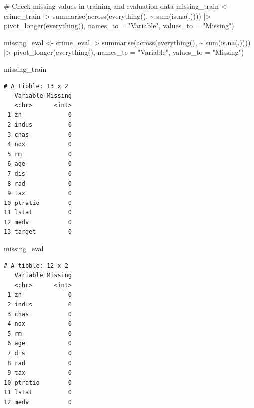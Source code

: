 \documentclass[
  11pt]{article}
\newenvironment{Shaded}{\begin{snugshade}}{\end{snugshade}}
\newcommand{\AttributeTok}[1]{\textcolor[rgb]{0.40,0.45,0.13}{#1}}
\newcommand{\CommentTok}[1]{\textcolor[rgb]{0.37,0.37,0.37}{#1}}
\newcommand{\FunctionTok}[1]{\textcolor[rgb]{0.28,0.35,0.67}{#1}}
\newcommand{\NormalTok}[1]{\textcolor[rgb]{0.00,0.23,0.31}{#1}}
\newcommand{\OtherTok}[1]{\textcolor[rgb]{0.00,0.23,0.31}{#1}}
\newcommand{\SpecialCharTok}[1]{\textcolor[rgb]{0.37,0.37,0.37}{#1}}
\newcommand{\StringTok}[1]{\textcolor[rgb]{0.13,0.47,0.30}{#1}}
\begin{document}
\begin{Shaded}
\begin{Highlighting}[]
\CommentTok{\# Check missing values in training and evaluation data}
\NormalTok{missing\_train }\OtherTok{\textless{}{-}}\NormalTok{ crime\_train }\SpecialCharTok{|\textgreater{}}
  \FunctionTok{summarise}\NormalTok{(}\FunctionTok{across}\NormalTok{(}\FunctionTok{everything}\NormalTok{(), }\SpecialCharTok{\textasciitilde{}} \FunctionTok{sum}\NormalTok{(}\FunctionTok{is.na}\NormalTok{(.)))) }\SpecialCharTok{|\textgreater{}}
  \FunctionTok{pivot\_longer}\NormalTok{(}\FunctionTok{everything}\NormalTok{(), }\AttributeTok{names\_to =} \StringTok{"Variable"}\NormalTok{, }\AttributeTok{values\_to =} \StringTok{"Missing"}\NormalTok{)}

\NormalTok{missing\_eval }\OtherTok{\textless{}{-}}\NormalTok{ crime\_eval }\SpecialCharTok{|\textgreater{}}
  \FunctionTok{summarise}\NormalTok{(}\FunctionTok{across}\NormalTok{(}\FunctionTok{everything}\NormalTok{(), }\SpecialCharTok{\textasciitilde{}} \FunctionTok{sum}\NormalTok{(}\FunctionTok{is.na}\NormalTok{(.)))) }\SpecialCharTok{|\textgreater{}}
  \FunctionTok{pivot\_longer}\NormalTok{(}\FunctionTok{everything}\NormalTok{(), }\AttributeTok{names\_to =} \StringTok{"Variable"}\NormalTok{, }\AttributeTok{values\_to =} \StringTok{"Missing"}\NormalTok{)}

\NormalTok{missing\_train}
\end{Highlighting}
\end{Shaded}

\begin{verbatim}
# A tibble: 13 x 2
   Variable Missing
   <chr>      <int>
 1 zn             0
 2 indus          0
 3 chas           0
 4 nox            0
 5 rm             0
 6 age            0
 7 dis            0
 8 rad            0
 9 tax            0
10 ptratio        0
11 lstat          0
12 medv           0
13 target         0
\end{verbatim}

\begin{Shaded}
\begin{Highlighting}[]
\NormalTok{missing\_eval}
\end{Highlighting}
\end{Shaded}

\begin{verbatim}
# A tibble: 12 x 2
   Variable Missing
   <chr>      <int>
 1 zn             0
 2 indus          0
 3 chas           0
 4 nox            0
 5 rm             0
 6 age            0
 7 dis            0
 8 rad            0
 9 tax            0
10 ptratio        0
11 lstat          0
12 medv           0
\end{verbatim}
\end{document}
